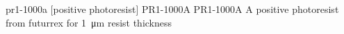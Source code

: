 \newglsXchemical%
{pr1-1000a}%
[positive photoresist]%
{PR1-1000A}%
{PR1-1000A}%
{A positive photoresist from \gls{futurrex} for \SI{1}{\micro\meter} resist thickness}%